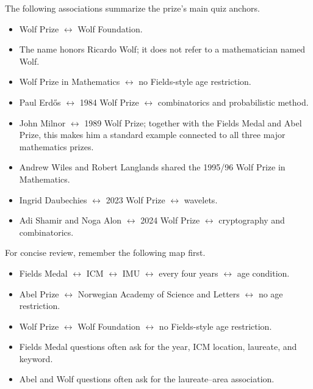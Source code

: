     \begin{fact}
        The following associations summarize the prize's main quiz anchors.
        \begin{itemize}
            \item Wolf Prize $\leftrightarrow$ Wolf Foundation.
            \item The name honors Ricardo Wolf; it does not refer to a
                  mathematician named Wolf.
            \item Wolf Prize in Mathematics $\leftrightarrow$ no Fields-style age restriction.
            \item Paul Erd\H{o}s $\leftrightarrow$ 1984 Wolf Prize $\leftrightarrow$ combinatorics and
            probabilistic method.
            \item John Milnor $\leftrightarrow$ 1989 Wolf Prize; together with the Fields Medal and
            Abel Prize, this makes him a standard example connected to all three major mathematics
            prizes.
            \item Andrew Wiles and Robert Langlands shared the 1995/96 Wolf Prize in Mathematics.
            \item Ingrid Daubechies $\leftrightarrow$ 2023 Wolf Prize $\leftrightarrow$ wavelets.
            \item Adi Shamir and Noga Alon $\leftrightarrow$ 2024 Wolf Prize $\leftrightarrow$
            cryptography and combinatorics.
        \end{itemize}
    \end{fact}

    \begin{fact}
        For concise review, remember the following map first.
        \begin{itemize}
            \item Fields Medal $\leftrightarrow$ ICM $\leftrightarrow$ IMU $\leftrightarrow$ every
            four years $\leftrightarrow$ age condition.
            \item Abel Prize $\leftrightarrow$ Norwegian Academy of Science and Letters
            $\leftrightarrow$ no age restriction.
            \item Wolf Prize $\leftrightarrow$ Wolf Foundation $\leftrightarrow$ no Fields-style age
            restriction.
            \item Fields Medal questions often ask for the year, ICM location, laureate, and
            keyword.
            \item Abel and Wolf questions often ask for the laureate--area association.
        \end{itemize}
    \end{fact}

